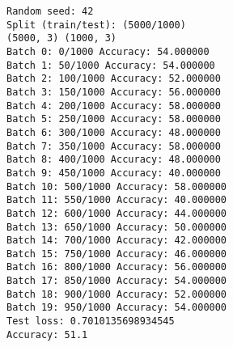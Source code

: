 \documentclass[11pt]{article}
\begin{document}
    \begin{Verbatim}[commandchars=\\\{\}]
Random seed: 42
Split (train/test): (5000/1000)
(5000, 3) (1000, 3)
Batch 0: 0/1000 Accuracy: 54.000000
Batch 1: 50/1000 Accuracy: 54.000000
Batch 2: 100/1000 Accuracy: 52.000000
Batch 3: 150/1000 Accuracy: 56.000000
Batch 4: 200/1000 Accuracy: 58.000000
Batch 5: 250/1000 Accuracy: 58.000000
Batch 6: 300/1000 Accuracy: 48.000000
Batch 7: 350/1000 Accuracy: 58.000000
Batch 8: 400/1000 Accuracy: 48.000000
Batch 9: 450/1000 Accuracy: 40.000000
Batch 10: 500/1000 Accuracy: 58.000000
Batch 11: 550/1000 Accuracy: 40.000000
Batch 12: 600/1000 Accuracy: 44.000000
Batch 13: 650/1000 Accuracy: 50.000000
Batch 14: 700/1000 Accuracy: 42.000000
Batch 15: 750/1000 Accuracy: 46.000000
Batch 16: 800/1000 Accuracy: 56.000000
Batch 17: 850/1000 Accuracy: 54.000000
Batch 18: 900/1000 Accuracy: 52.000000
Batch 19: 950/1000 Accuracy: 54.000000
Test loss: 0.7010135698934545
Accuracy: 51.1

    \end{Verbatim}
\end{document}

